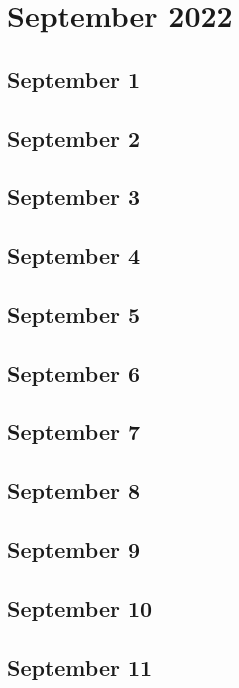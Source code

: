 \chapter{September 2022}

\section{September 1}

\section{September 2}

\section{September 3}

\section{September 4}

\section{September 5}

\section{September 6}

\section{September 7}

\section{September 8}

\section{September 9}

\section{September 10}

\section{September 11}

